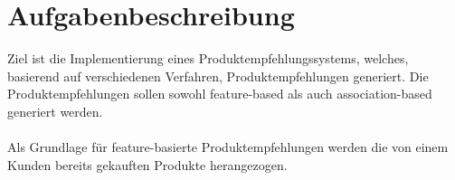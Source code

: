 \chapter{Aufgabenbeschreibung}
Ziel ist die Implementierung eines Produktempfehlungssystems, welches, basierend auf verschiedenen Verfahren, Produktempfehlungen generiert. Die Produktempfehlungen sollen sowohl feature-based als auch association-based generiert werden. \\
\\
Als Grundlage für feature-basierte Produktempfehlungen werden die von einem Kunden bereits gekauften Produkte herangezogen. 